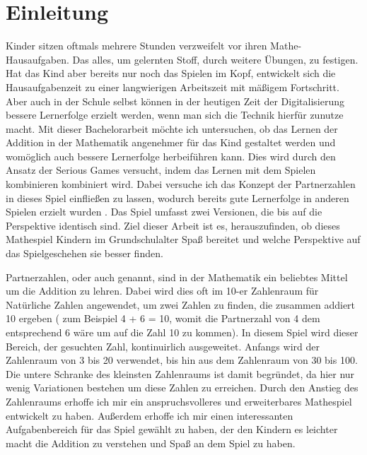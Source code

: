 
\chapter{Einleitung}
Kinder sitzen oftmals mehrere Stunden verzweifelt vor ihren Mathe-Hausaufgaben. Das alles, um gelernten Stoff, durch weitere Übungen, zu festigen. Hat das Kind aber bereits nur noch das Spielen im Kopf, entwickelt sich die Hausaufgabenzeit zu einer langwierigen Arbeitszeit mit mäßigem Fortschritt. Aber auch in der Schule selbst können in der heutigen Zeit der Digitalisierung bessere Lernerfolge erzielt werden, wenn man sich die Technik hierfür zunutze macht. Mit dieser Bachelorarbeit möchte ich untersuchen, ob das Lernen der Addition in der Mathematik angenehmer für das Kind gestaltet werden und womöglich auch bessere Lernerfolge herbeiführen kann. Dies wird durch den Ansatz der Serious Games versucht, indem das Lernen mit dem Spielen kombinieren kombiniert wird. Dabei versuche ich das Konzept der Partnerzahlen in dieses Spiel einfließen zu lassen, wodurch bereits gute Lernerfolge in anderen Spielen erzielt wurden \cite{Jung2016}. Das Spiel umfasst zwei Versionen, die bis auf die Perspektive identisch sind. Ziel dieser Arbeit ist es, herauszufinden, ob dieses Mathespiel Kindern im Grundschulalter Spaß bereitet und welche Perspektive auf das Spielgeschehen sie besser finden.

Partnerzahlen, oder auch  genannt, sind in der Mathematik ein beliebtes Mittel um die Addition zu lehren. Dabei wird dies oft im 10-er Zahlenraum für Natürliche Zahlen angewendet, um zwei Zahlen zu finden, die zusammen addiert 10 ergeben ( zum Beispiel 4 + 6 = 10, womit die Partnerzahl von 4 dem entsprechend 6 wäre um auf die Zahl 10 zu kommen). In diesem Spiel wird dieser Bereich, der gesuchten Zahl, kontinuirlich ausgeweitet. Anfangs wird der Zahlenraum von 3 bis 20 verwendet, bis hin aus dem Zahlenraum von 30 bis 100. Die untere Schranke des kleinsten Zahlenraums ist damit begründet, da hier nur wenig Variationen bestehen um diese Zahlen zu erreichen. Durch den Anstieg des Zahlenraums erhoffe ich mir ein anspruchsvolleres und erweiterbares Mathespiel entwickelt zu haben. Außerdem erhoffe ich mir einen interessanten Aufgabenbereich für das Spiel gewählt zu haben, der den Kindern es leichter macht die Addition zu verstehen und Spaß an dem Spiel zu haben.

